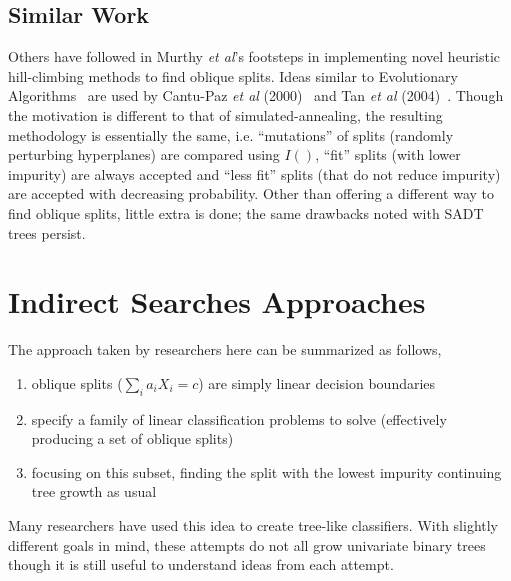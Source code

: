 \subsection{Similar Work}
\label{SimilarWork}
Others have followed in Murthy \emph{et al}'s footsteps in implementing novel heuristic hill-climbing methods to find oblique splits. Ideas similar to Evolutionary Algorithms~\cite{129194} are used by Cantu-Paz \emph{et al} (2000)~\cite{cantupaz00using}\cite{cantu-paz-inducing} and Tan \emph{et al} (2004)~\cite{tan04}. Though the motivation is different to that of simulated-annealing, the resulting methodology is essentially the same, i.e. ``mutations'' of splits (randomly perturbing hyperplanes) are compared using $I()$, ``fit'' splits (with lower impurity) are always accepted and ``less fit'' splits (that do not reduce impurity) are accepted with decreasing probability. Other than offering a different way to find oblique splits, little extra is done; the same drawbacks noted with SADT trees persist.

\section{Indirect Searches Approaches}
\label{IndirectSearchApproaches}
The approach taken by researchers here can be summarized as follows,
\begin{enumerate}
\item oblique splits ($\sum_i a_iX_i=c$) are simply linear decision boundaries
\item specify a family of linear classification problems to solve (effectively producing a set of oblique splits)
	\begin{comment}
	\begin{enumerate}
		\item \emph{residual observations} from the training set that fall into each node during tree growth can be considered as a separate classification problem (on a restricted domain)
		\item by training a classifier on these data, we can use their predictions as outcomes of some (possibly complex) test at this node
		\item choosing a linear classifier in particular, we essentially find ourselves oblique splits at this nodes 
	\end{enumerate}
	\end{comment}
\item focusing on this subset, finding the split with the lowest impurity continuing tree growth as usual
\end{enumerate}
Many researchers have used this idea to create tree-like classifiers. With slightly different goals in mind, these attempts do not all grow univariate binary trees though it is still useful to understand ideas from each attempt.

